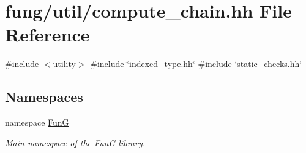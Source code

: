 \hypertarget{compute__chain_8hh}{\section{fung/util/compute\-\_\-chain.hh \-File \-Reference}
\label{compute__chain_8hh}
}
{\ttfamily \#include $<$utility$>$}\*
{\ttfamily \#include \char`\"{}indexed\-\_\-type.\-hh\char`\"{}}\*
{\ttfamily \#include \char`\"{}static\-\_\-checks.\-hh\char`\"{}}\*
\subsection*{\-Namespaces}
\begin{DoxyCompactItemize}
\item 
namespace \hyperlink{namespaceFunG}{\-Fun\-G}
\begin{DoxyCompactList}\small\item\em \-Main namespace of the \-Fun\-G library. \end{DoxyCompactList}\end{DoxyCompactItemize}
